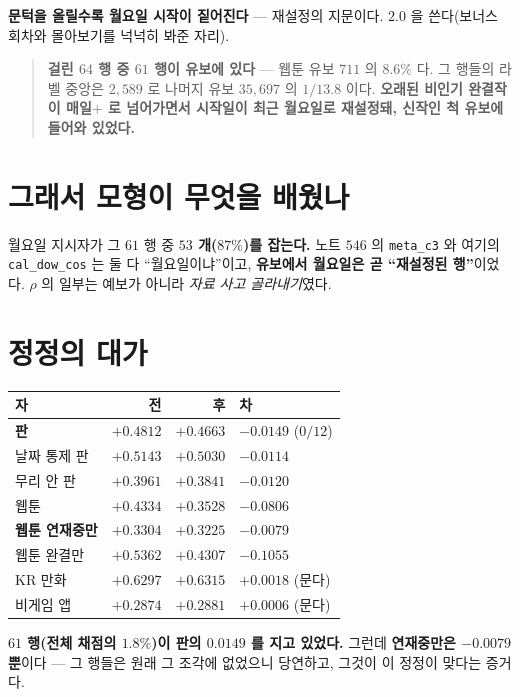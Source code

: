 \documentclass[11pt]{article}
\begin{document}
\textbf{문턱을 올릴수록 월요일 시작이 짙어진다} --- 재설정의 지문이다.
$2.0$ 을 쓴다(보너스 회차와 몰아보기를 넉넉히 봐준 자리).

\begin{quote}
\textbf{걸린 $64$ 행 중 $61$ 행이 유보에 있다} --- 웹툰 유보 $711$ 의
$8.6\%$ 다. 그 행들의 라벨 중앙은 $2{,}589$ 로 나머지 유보 $35{,}697$ 의
\textbf{$1/13.8$} 이다. \textbf{오래된 비인기 완결작이 매일$+$ 로 넘어가면서
시작일이 최근 월요일로 재설정돼, 신작인 척 유보에 들어와 있었다.}
\end{quote}

\section{그래서 모형이 무엇을 배웠나}

월요일 지시자가 그 $61$ 행 중 \textbf{$53$ 개($87\%$)를 잡는다.} 노트 $546$
의 \texttt{meta\_c3} 와 여기의 \texttt{cal\_dow\_cos} 는 둘 다
``월요일이냐''이고, \textbf{유보에서 월요일은 곧 ``재설정된 행''}이었다.
$\rho$ 의 일부는 예보가 아니라 \emph{자료 사고 골라내기}였다.

\section{정정의 대가}

\begin{center}
\begin{tabular}{lrrl}
\hline
자 & 전 & 후 & 차 \\
\hline
\textbf{판} & $+0.4812$ & $\mathbf{+0.4663}$ & $-0.0149$ ($0/12$) \\
날짜 통제 판 & $+0.5143$ & $+0.5030$ & $-0.0114$ \\
무리 안 판 & $+0.3961$ & $+0.3841$ & $-0.0120$ \\
웹툰 & $+0.4334$ & $+0.3528$ & $-0.0806$ \\
\textbf{웹툰 연재중만} & $+0.3304$ & $+0.3225$ & $\mathbf{-0.0079}$ \\
웹툰 완결만 & $+0.5362$ & $+0.4307$ & $-0.1055$ \\
KR 만화 & $+0.6297$ & $+0.6315$ & $+0.0018$ (문다) \\
비게임 앱 & $+0.2874$ & $+0.2881$ & $+0.0006$ (문다) \\
\hline
\end{tabular}
\end{center}

\textbf{$61$ 행(전체 채점의 $1.8\%$)이 판의 $0.0149$ 를 지고 있었다.}
그런데 \textbf{연재중만은 $-0.0079$ 뿐}이다 --- 그 행들은 원래 그 조각에
없었으니 당연하고, 그것이 이 정정이 맞다는 증거다.
\end{document}
